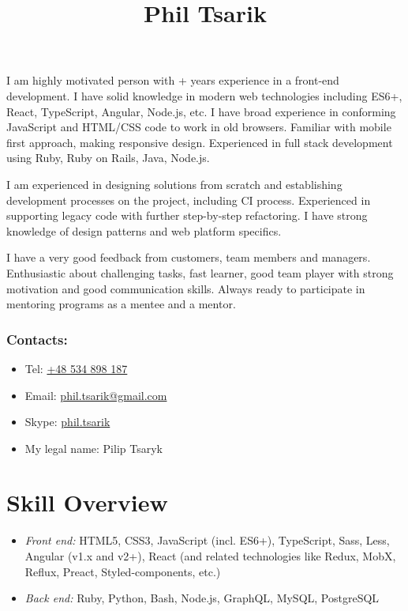 \documentclass[a4paper, 12pt]{article}
\title{Phil Tsarik}
\author{}
\date{}
\newcommand{\itemlabel}[1]{
    \textit{#1:}}
\newcommand{\defvalue}[2]{\ifx#1\empty#2\else#1\fi}
\newcommand{\yearsexp}{%
    \FPeval{\result}{clip(\the\year - 2011)}%
    \defvalue{\result}{6+}}
\begin{document}
\maketitle

I am highly motivated person with \yearsexp{} years experience in a front-end development.
I have solid knowledge in modern web technologies including ES6+, React, TypeScript, Angular, Node.js, etc.
I have broad experience in conforming JavaScript and HTML/CSS code to work in old browsers.
Familiar with mobile first approach, making responsive design.
Experienced in full stack development using Ruby, Ruby on Rails, Java, Node.js.

I am experienced in designing solutions from scratch and establishing development processes on the project, including CI process.
Experienced in supporting legacy code with further step-by-step refactoring.
I have strong knowledge of design patterns and web platform specifics.

I have a very good feedback from customers, team members and managers.
Enthusiastic about challenging tasks, fast learner, good team player with strong motivation and good communication skills.
Always ready to participate in mentoring programs as a mentee and a mentor.

\subsubsection*{Contacts:}
\begin{itemize}
    \item Tel: \href{tel:+48534898187}{+48 534 898 187}
    \item Email: \href{mailto:phil.tsarik@gmail.com}{phil.tsarik@gmail.com}
    \item Skype: \href{callto:phil.tsarik}{phil.tsarik}
    \item My legal name: Pilip Tsaryk
\end{itemize}


\section*{Skill Overview}

    \begin{itemize}
        \item \itemlabel{Front end} HTML5, CSS3, JavaScript (incl. ES6+), TypeScript, Sass, Less, Angular (v1.x and v2+), React (and related technologies like Redux, MobX, Reflux, Preact, Styled-components, etc.)
        \item \itemlabel{Back end} Ruby, Python, Bash, Node.js, GraphQL, MySQL, PostgreSQL
    \end{itemize}
\end{document}
